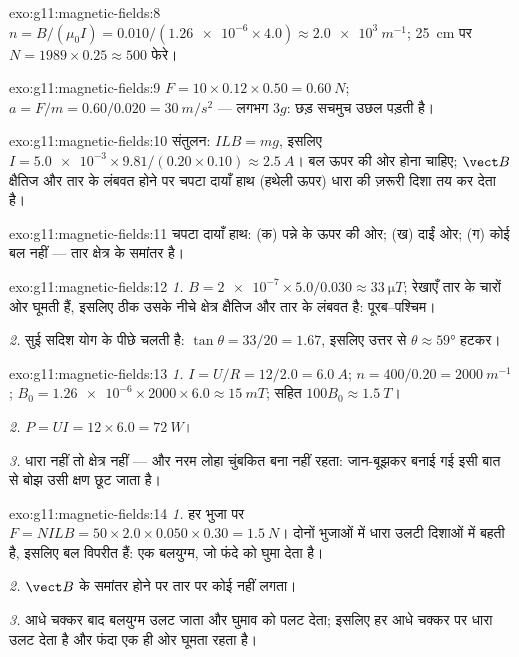 \begin{solution}{exo:g11:magnetic-fields:8}
$n = B/(\mu_0 I) = 0.010 / (\num{1.26e-6} \times 4.0)
\approx \qty{2.0e3}{m^{-1}}$; \qty{25}{cm} पर $N = 1989 \times 0.25 \approx 500$ फेरे।
\end{solution}

\begin{solution}{exo:g11:magnetic-fields:9}
$F = 10 \times 0.12 \times 0.50 = \qty{0.60}{N}$; $a = F/m = 0.60/0.020 = \qty{30}{m/s^2}$ --- लगभग $3g$: छड़ सचमुच उछल पड़ती है।
\end{solution}

\begin{solution}{exo:g11:magnetic-fields:10}
संतुलन: $ILB = mg$, इसलिए $I = \num{5.0e-3} \times 9.81 / (0.20 \times 0.10) \approx
\qty{2.5}{A}$। बल ऊपर की ओर होना चाहिए; $\vect B$ क्षैतिज
और तार के लंबवत होने पर चपटा दायाँ हाथ (हथेली ऊपर) धारा की ज़रूरी दिशा तय कर
देता है।
\end{solution}

\begin{solution}{exo:g11:magnetic-fields:11}
चपटा दायाँ हाथ: (क) पन्ने के ऊपर की ओर; (ख) दाईं ओर; (ग) कोई बल
नहीं --- तार क्षेत्र के समांतर है।
\end{solution}

\begin{solution}{exo:g11:magnetic-fields:12}
\emph{1.} $B = \num{2e-7} \times 5.0 / 0.030 \approx
\qty{33}{\micro T}$; रेखाएँ तार के चारों ओर घूमती हैं, इसलिए ठीक उसके नीचे
क्षेत्र क्षैतिज और तार के लंबवत है: पूरब--पश्चिम।

\emph{2.} सुई सदिश योग के पीछे चलती है: $\tan\theta = 33/20 =
1.67$, इसलिए उत्तर से $\theta \approx \ang{59}$ हटकर।
\end{solution}

\begin{solution}{exo:g11:magnetic-fields:13}
\emph{1.} $I = U/R = 12/2.0 = \qty{6.0}{A}$; $n = 400/0.20 = \qty{2000}{m^{-1}}$; $B_0 = \num{1.26e-6} \times 2000 \times 6.0 \approx \qty{15}{mT}$;  सहित $100 B_0 \approx \qty{1.5}{T}$।

\emph{2.} $P = UI = 12 \times 6.0 = \qty{72}{W}$।

\emph{3.} धारा नहीं तो क्षेत्र नहीं --- और नरम लोहा चुंबकित बना नहीं
रहता: जान-बूझकर बनाई गई इसी बात से बोझ उसी क्षण छूट जाता है।
\end{solution}

\begin{solution}{exo:g11:magnetic-fields:14}
\emph{1.} हर भुजा पर $F = NILB = 50 \times 2.0 \times 0.050 \times 0.30 =
\qty{1.5}{N}$। दोनों भुजाओं में धारा उलटी दिशाओं में बहती है,
इसलिए बल विपरीत हैं: एक बलयुग्म, जो फंदे को घुमा देता है।

\emph{2.} $\vect B$ के समांतर होने पर तार पर कोई  नहीं लगता।

\emph{3.} आधे चक्कर बाद बलयुग्म उलट जाता और घुमाव को पलट देता; इसलिए
 हर आधे चक्कर पर धारा उलट देता है और फंदा एक ही ओर घूमता
रहता है।
\end{solution}

